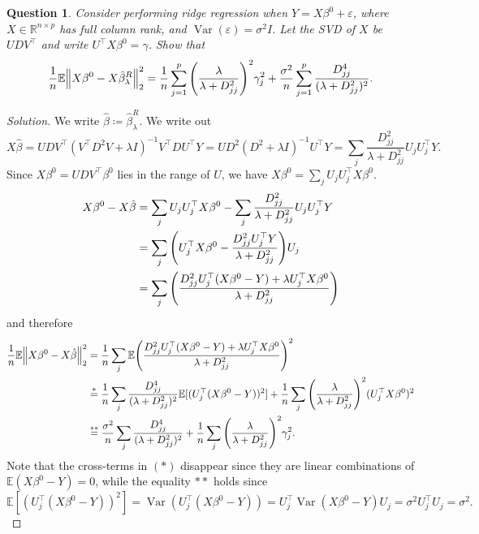 \documentclass{article}
\theoremstyle{plain}
\newtheorem{question}{Question}
\theoremstyle{remark}
\newenvironment{solution}{\begin{proof}[Solution]\renewcommand\qedsymbol{}}{\end{proof}}
\renewcommand{\epsilon}{\varepsilon}
\newcommand{\Bb}{\mathbb}
\newcommand{\RR}{\Bb R}
\newcommand{\EE}{\Bb E}
\newcommand{\T}{^\top} %
\newcommand\ceq\coloneqq %
\newcommand\eps\epsilon
\DeclareMathOperator{\Var}{Var}
\begin{document}
\begin{question}
    Consider performing ridge regression when $Y = X \beta^0 + \eps$, where $X \in \RR^{n \times p}$ has full column rank, and $\Var(\eps) = \sigma^2 I$. Let the SVD of $X$ be $UDV\T$ and write $U\T X \beta^0 = \gamma$. Show that
    \[
    \frac1n \EE\norm{X \beta^0 - X \hat\beta_\lambda^R}_2^2 = \frac1n \sum_{j=1}^p \qty(\frac\lambda{\lambda + D_{jj}^2})^2 \gamma_j^2 + \frac{\sigma^2}{n} \sum_{j=1}^p \frac{D_{jj}^4}{(\lambda + D_{jj}^2)^2}. 
    \]
\end{question}

\begin{solution}
    We write $\hat\beta \ceq \hat\beta_\lambda^R$. We write out
    \[
    X\hat\beta = UDV\T (V\T D^2 V + \lambda I)^{-1} V\T D U\T Y =  UD^2 (D^2 + \lambda I)^{-1} U\T Y = \sum_j \frac{D_{jj}^2}{\lambda + D_{jj}^2} U_j U_j\T Y. 
    \]
    Since $X\beta^0 = UDV\T \beta^0$ lies in the range of $U$, we have $X\beta^0 = \sum_j U_j U_j\T X\beta^0$. 
    \begin{align*}
        X\beta^0 - X\hat\beta &= \sum_j U_j U_j\T X \beta^0 -  \sum_j \frac{D_{jj}^2}{\lambda + D_{jj}^2} U_j U_j\T Y \\
        &= \sum_j \qty(U_j\T X \beta^0 - \frac{D_{jj}^2 U_j\T Y}{\lambda + D_{jj}^2}) U_j \\
        &= \sum_j \qty(\frac{D_{jj}^2 U_j\T (X\beta^0 - Y) + \lambda U_j\T X \beta^0}{\lambda + D_{jj}^2})
    \end{align*}
and therefore
\begin{align*}
    \frac1n \EE\norm{X\beta^0 - X\hat\beta}_2^2 &= \frac1n \sum_j \EE \qty(\frac{D_{jj}^2 U_j\T (X\beta^0 - Y) + \lambda U_j\T X \beta^0}{\lambda + D_{jj}^2})^2 \\
    &\overset{*}= \frac1n \sum_j \frac{D_{jj}^4}{(\lambda + D_{jj}^2)^2} \EE[(U_j\T (X\beta^0 - Y))^2] + \frac1n \sum_j \qty(\frac{\lambda}{\lambda + D_{jj}^2})^2  (U_j\T X \beta^0)^2 \\
&\overset{**}= \frac{\sigma^2}{n} \sum_j \frac{D_{jj}^4}{(\lambda + D_{jj}^2)^2}  + \frac1n \sum_j \qty(\frac{\lambda}{\lambda + D_{jj}^2})^2  \gamma_j^2.
\end{align*}
Note that the cross-terms in $(*)$ disappear since they are linear combinations of $\EE(X\beta^0 - Y) = 0$, while the equality $**$ holds since 
\[
\EE[(U_j\T(X \beta^0 - Y))^2] = \Var(U_j\T (X\beta^0 - Y)) = U_j\T \Var(X\beta^0 - Y) U_j = \sigma^2 U_j\T U_j = \sigma^2. 
\]
\end{solution}
\end{document}
